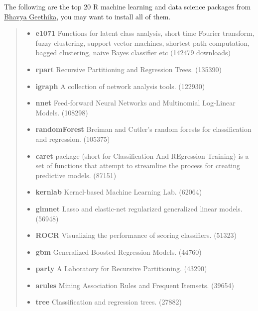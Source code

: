 \documentclass[letterpaper,11pt,english]{sphinxmanual}
\begin{document}
The following are the top 20 R machine learning and data science packages from \href{http://www.kdnuggets.com/2015/06/top-20-r-machine-learning-packages.html}{Bhavya Geethika}, you may want to install all of them.
\begin{quote}
\begin{itemize}
\item {} 
\textbf{e1071} Functions for latent class analysis, short time Fourier transform, fuzzy clustering, support vector machines, shortest path computation, bagged clustering, naive Bayes classifier etc (142479 downloads)

\item {} 
\textbf{rpart} Recursive Partitioning and Regression Trees. (135390)

\item {} 
\textbf{igraph} A collection of network analysis tools. (122930)

\item {} 
\textbf{nnet} Feed-forward Neural Networks and Multinomial Log-Linear Models. (108298)

\item {} 
\textbf{randomForest} Breiman and Cutler's random forests for classification and regression. (105375)

\item {} 
\textbf{caret} package (short for Classification And REgression Training) is a set of functions that attempt to streamline the process for creating predictive models. (87151)

\item {} 
\textbf{kernlab} Kernel-based Machine Learning Lab. (62064)

\item {} 
\textbf{glmnet} Lasso and elastic-net regularized generalized linear models. (56948)

\item {} 
\textbf{ROCR} Visualizing the performance of scoring classifiers. (51323)

\item {} 
\textbf{gbm} Generalized Boosted Regression Models. (44760)

\item {} 
\textbf{party} A Laboratory for Recursive Partitioning. (43290)

\item {} 
\textbf{arules} Mining Association Rules and Frequent Itemsets. (39654)

\item {} 
\textbf{tree} Classification and regression trees. (27882)


\end{itemize}
\end{quote}
\end{document}
